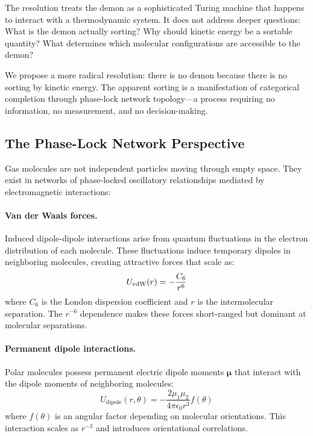 The resolution treats the demon as a sophisticated Turing machine that happens to interact with a thermodynamic system. It does not address deeper questions: What is the demon actually sorting? Why should kinetic energy be a sortable quantity? What determines which molecular configurations are accessible to the demon?

We propose a more radical resolution: there is no demon because there is no sorting by kinetic energy. The apparent sorting is a manifestation of categorical completion through phase-lock network topology---a process requiring no information, no measurement, and no decision-making.

\subsection{The Phase-Lock Network Perspective}

Gas molecules are not independent particles moving through empty space. They exist in networks of phase-locked oscillatory relationships mediated by electromagnetic interactions:

\paragraph{Van der Waals forces.} Induced dipole-dipole interactions arise from quantum fluctuations in the electron distribution of each molecule. These fluctuations induce temporary dipoles in neighboring molecules, creating attractive forces that scale as:
\begin{equation}
U_{\text{vdW}}(r) = -\frac{C_6}{r^6}
\label{eq:vdw}
\end{equation}
where $C_6$ is the London dispersion coefficient and $r$ is the intermolecular separation. The $r^{-6}$ dependence makes these forces short-ranged but dominant at molecular separations.

\paragraph{Permanent dipole interactions.} Polar molecules possess permanent electric dipole moments $\bm{\mu}$ that interact with the dipole moments of neighboring molecules:
\begin{equation}
U_{\text{dipole}}(r, \theta) = -\frac{2\mu_1 \mu_2}{4\pi\epsilon_0 r^3} f(\theta)
\label{eq:dipole}
\end{equation}
where $f(\theta)$ is an angular factor depending on molecular orientations. This interaction scales as $r^{-3}$ and introduces orientational correlations.

